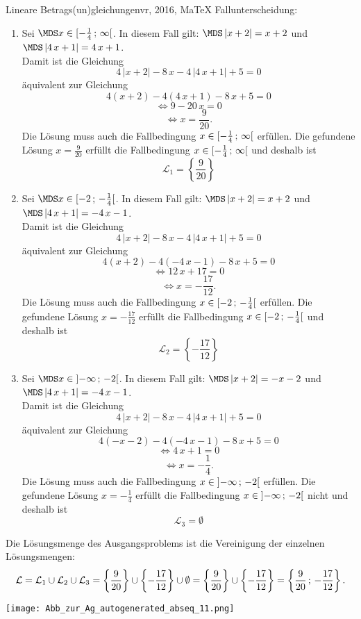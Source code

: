 \begin{MAufgabe}{Lineare Betrags(un)gleichungen}{vr, 2016, MaTeX}
 Fallunterscheidung: 

 \begin{enumerate} 
 \item Sei $ \MDS x\in[ - \frac{1}{4} \, \MIntvlSep \, \infty\MoIr $. 
 In diesem Fall gilt: 
  $ \MDS \left| x + 2\right|=x + 2$ und $ \MDS \left| 4\, x + 1\right|=4\, x + 1$. \\ 
 Damit ist die Gleichung 
 $$ 
4\, \left|x + 2\right| - 8\, x - 4\, \left|4\, x + 1\right| + 5= 0
$$
 \"aquivalent zur Gleichung
 $$ 
4\left(x + 2\right)-4\left( 4\, x + 1\right)- 8\, x+5= 0 
$$  
$$ 
 \Leftrightarrow 9 - 20\, x= 0 
$$  
$$ \Leftrightarrow x = \frac{9}{20} . 
 $$ 
 Die L\"osung muss auch die Fallbedingung $x\in [ - \frac{1}{4} \, ; \, \infty[\mbox{}  $ erf\"ullen. Die gefundene L\"osung $x=\frac{9}{20}$ erf\"ullt die Fallbedingung  $x\in [ - \frac{1}{4} \, ; \, \infty[\mbox{} $ und deshalb ist  $$
 \mathcal{L}_{1}=\left\{\frac{9}{20}\right\}
 $$ 
\item Sei $ \MDS x\in[ -2 \, \MIntvlSep \, - \frac{1}{4}\MoIr $. 
 In diesem Fall gilt: 
  $ \MDS \left| x + 2\right|=x + 2$ und $ \MDS \left| 4\, x + 1\right|= - 4\, x - 1$. \\ 
 Damit ist die Gleichung 
 $$ 
4\, \left|x + 2\right| - 8\, x - 4\, \left|4\, x + 1\right| + 5= 0
$$
 \"aquivalent zur Gleichung
 $$ 
4\left(x + 2\right)-4\left(  - 4\, x - 1\right)- 8\, x+5= 0 
$$  
$$ 
 \Leftrightarrow 12\, x + 17= 0 
$$  
$$ \Leftrightarrow x = - \frac{17}{12} . 
 $$ 
 Die L\"osung muss auch die Fallbedingung $x\in [ -2 \, ; \, - \frac{1}{4}[\mbox{}  $ erf\"ullen. Die gefundene L\"osung $x=- \frac{17}{12}$ erf\"ullt die Fallbedingung  $x\in [ -2 \, ; \, - \frac{1}{4}[\mbox{} $ und deshalb ist  $$
 \mathcal{L}_{2}=\left\{- \frac{17}{12}\right\}
 $$ 
\item Sei $ \MDS x\in\MoIl  -\infty \, \MIntvlSep \, -2\MoIr $. 
 In diesem Fall gilt: 
  $ \MDS \left| x + 2\right|= - x - 2$ und $ \MDS \left| 4\, x + 1\right|= - 4\, x - 1$. \\ 
 Damit ist die Gleichung 
 $$ 
4\, \left|x + 2\right| - 8\, x - 4\, \left|4\, x + 1\right| + 5= 0
$$
 \"aquivalent zur Gleichung
 $$ 
4\left( - x - 2\right)-4\left(  - 4\, x - 1\right)- 8\, x+5= 0 
$$  
$$ 
 \Leftrightarrow 4\, x + 1= 0 
$$  
$$ \Leftrightarrow x = - \frac{1}{4} . 
 $$ 
 Die L\"osung muss auch die Fallbedingung $x\in \mbox{}]\mathopen{}  -\infty \, ; \, -2[\mbox{}  $ erf\"ullen. Die gefundene L\"osung $x=- \frac{1}{4}$ erf\"ullt die Fallbedingung  $x\in \mbox{}]\mathopen{}  -\infty \, ; \, -2[\mbox{} $ nicht und deshalb ist  $$
 \mathcal{L}_{3}=\emptyset 
 $$ 
 \end{enumerate} 
  Die L\"osungsmenge des Ausgangsproblems ist die Vereinigung der einzelnen L\"osungsmengen: 
$$ \mathcal{L} = \mathcal{L}_{1} \cup \mathcal{L}_{2} \cup \mathcal{L}_{3} 
 = \left\{\frac{9}{20}\right\}\cup \left\{- \frac{17}{12}\right\}\cup \emptyset 
  =\left\{\frac{9}{20}\right\}\cup\left\{- \frac{17}{12}\right\} 
  = \left\{\frac{9}{20}\, ; \,- \frac{17}{12}\right\} 
 . $$ 
 
 \begin{center}
 \texttt{[image: Abb\_zur\_Ag\_autogenerated\_abseq\_11.png]} \end{center}
 
\else\relax\fi
 \end{MAufgabe}